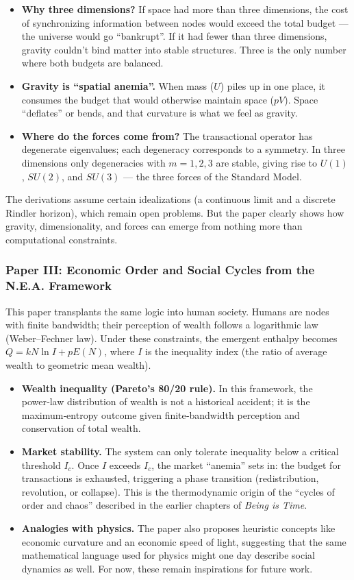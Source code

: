 \documentclass{article}
\begin{document}
\begin{itemize}
    \item \textbf{Why three dimensions?} If space had more than three dimensions, the cost of synchronizing information between nodes would exceed the total budget — the universe would go “bankrupt”. If it had fewer than three dimensions, gravity couldn’t bind matter into stable structures. Three is the only number where both budgets are balanced.
    \item \textbf{Gravity is “spatial anemia”.} When mass (\(U\)) piles up in one place, it consumes the budget that would otherwise maintain space (\(pV\)). Space “deflates” or bends, and that curvature is what we feel as gravity.
    \item \textbf{Where do the forces come from?} The transactional operator has degenerate eigenvalues; each degeneracy corresponds to a symmetry. In three dimensions only degeneracies with \(m=1,2,3\) are stable, giving rise to \(U(1)\), \(SU(2)\), and \(SU(3)\) — the three forces of the Standard Model.
\end{itemize}

The derivations assume certain idealizations (a continuous limit and a discrete Rindler horizon), which remain open problems. But the paper clearly shows how gravity, dimensionality, and forces can emerge from nothing more than computational constraints.

\subsubsection*{Paper III: Economic Order and Social Cycles from the N.E.A. Framework}

This paper transplants the same logic into human society. Humans are nodes with finite bandwidth; their perception of wealth follows a logarithmic law (Weber–Fechner law). Under these constraints, the emergent enthalpy becomes \(Q = k N \ln I + p E(N)\), where \(I\) is the inequality index (the ratio of average wealth to geometric mean wealth).

\begin{itemize}
    \item \textbf{Wealth inequality (Pareto’s 80/20 rule).} In this framework, the power‑law distribution of wealth is not a historical accident; it is the maximum‑entropy outcome given finite‑bandwidth perception and conservation of total wealth.
    \item \textbf{Market stability.} The system can only tolerate inequality below a critical threshold \(I_c\). Once \(I\) exceeds \(I_c\), the market “anemia” sets in: the budget for transactions is exhausted, triggering a phase transition (redistribution, revolution, or collapse). This is the thermodynamic origin of the “cycles of order and chaos” described in the earlier chapters of \textit{Being is Time}.
    \item \textbf{Analogies with physics.} The paper also proposes heuristic concepts like economic curvature and an economic speed of light, suggesting that the same mathematical language used for physics might one day describe social dynamics as well. For now, these remain inspirations for future work.
\end{itemize}
\end{document}
